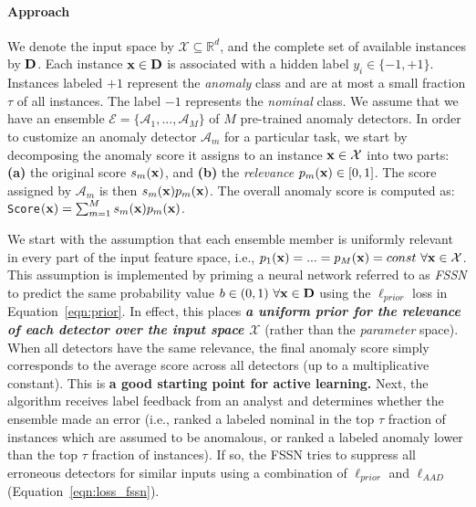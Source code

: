 \documentclass{article}
\begin{document}
\paragraph{Approach} We denote the input space by $\mathcal{X} \subseteq \mathbb{R}^d$, and the complete set of available instances by ${\bf D}$. Each instance ${\bf x} \in {\bf D}$ is associated with a hidden label $y_i \in \{-1, +1\}$. Instances labeled $+1$ represent the \textit{anomaly} class and are at most a small fraction $\tau$ of all instances. The label $-1$ represents the \textit{nominal} class. We assume that we have an ensemble $\mathcal{E} = \{\mathcal{A}_1, ..., \mathcal{A}_M\}$ of $M$ pre-trained anomaly detectors. In order to customize an anomaly detector $\mathcal{A}_m$ for a particular task, we start by decomposing the anomaly score it assigns to an instance ${\bf x} \in \mathcal{X}$ into two parts: {\bf (a)} the original score $s_m({\bf x})$, and {\bf (b)} the \textit{relevance} $p_m({\bf x}) \in [0, 1]$. The score assigned by $\mathcal{A}_m$ is then $s_m({\bf x})p_m({\bf x})$. The overall anomaly score is computed as: \texttt{Score}$({\bf x}) = \sum_{m=1}^M{s_m({\bf x})p_m({\bf x})}$.

We start with the assumption that each ensemble member is uniformly relevant in every part of the input feature space, i.e., $p_1({\bf x}) = ... = p_M({\bf x}) = const \ \forall {\bf x} \in \mathcal{X}$. This assumption is implemented by priming a neural network referred to as \textit{FSSN} to predict the same probability value $b \in (0, 1) \ \forall {\bf x} \in {\bf D}$ using the $\ell_{prior}$ loss in Equation~\ref{eqn:prior}. In effect, this places \textit{\textbf{a uniform prior for the relevance of each detector over the input space $\mathcal{X}$}}  (rather than the {\em parameter} space). When all detectors have the same relevance, the final anomaly score simply corresponds to the average score across all detectors (up to a multiplicative constant). This is \textbf{a good starting point for active learning.} Next, the algorithm receives label feedback from an analyst and determines whether the ensemble made an error (i.e., ranked a labeled nominal in the top $\tau$ fraction of instances which are assumed to be anomalous, or ranked a labeled anomaly lower than the top $\tau$ fraction of instances). If so, the FSSN tries to suppress all erroneous detectors for similar inputs using a combination of $\ell_{prior}$ and $\ell_{AAD}$ (Equation~\ref{eqn:loss_fssn}).
\end{document}
